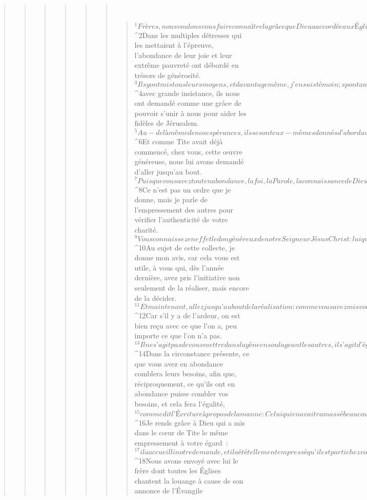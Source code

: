 \begin{verse}
\begin{verse}
\begin{verse}
\begin{verse}
\begin{verse}
\begin{verse}
         
      \bchapter{}
      \begin{verse}
${}^{1}Frères, nous voulons vous faire connaître la grâce que Dieu a accordée aux Églises de Macédoine. 
${}^{2}Dans les multiples détresses qui les mettaient à l’épreuve, l’abondance de leur joie et leur extrême pauvreté ont débordé en trésors de générosité. 
${}^{3}Ils y ont mis tous leurs moyens, et davantage même, j’en suis témoin ; spontanément, 
${}^{4}avec grande insistance, ils nous ont demandé comme une grâce de pouvoir s’unir à nous pour aider les fidèles de Jérusalem. 
${}^{5}Au-delà même de nos espérances, ils se sont eux-mêmes donnés d’abord au Seigneur, et ensuite à nous, par la volonté de Dieu. 
${}^{6}Et comme Tite avait déjà commencé, chez vous, cette œuvre généreuse, nous lui avons demandé d’aller jusqu’au bout. 
${}^{7}Puisque vous avez tout en abondance, la foi, la Parole, la connaissance de Dieu, toute sorte d’empressement et l’amour qui vous vient de nous, qu’il y ait aussi abondance dans votre don généreux ! 
${}^{8}Ce n’est pas un ordre que je donne, mais je parle de l’empressement des autres pour vérifier l’authenticité de votre charité. 
${}^{9}Vous connaissez en effet le don généreux de notre Seigneur Jésus Christ : lui qui est riche, il s’est fait pauvre à cause de vous, pour que vous deveniez riches par sa pauvreté.
${}^{10}Au sujet de cette collecte, je donne mon avis, car cela vous est utile, à vous qui, dès l’année dernière, avez pris l’initiative non seulement de la réaliser, mais encore de la décider. 
${}^{11}Et maintenant, allez jusqu’au bout de la réalisation : comme vous avez mis votre ardeur à prendre cette décision, ainsi vous irez jusqu’au bout, selon vos moyens. 
${}^{12}Car s’il y a de l’ardeur, on est bien reçu avec ce que l’on a, peu importe ce que l’on n’a pas. 
${}^{13}Il ne s’agit pas de vous mettre dans la gêne en soulageant les autres, il s’agit d’égalité. 
${}^{14}Dans la circonstance présente, ce que vous avez en abondance comblera leurs besoins, afin que, réciproquement, ce qu’ils ont en abondance puisse combler vos besoins, et cela fera l’égalité, 
${}^{15}comme dit l’Écriture à propos de la manne : Celui qui en avait ramassé beaucoup n’eut rien de trop, celui qui en avait ramassé peu ne manqua de rien.
${}^{16}Je rends grâce à Dieu qui a mis dans le cœur de Tite le même empressement à votre égard : 
${}^{17}il a accueilli notre demande, et il a été tellement empressé qu’il est parti chez vous spontanément. 
${}^{18}Nous avons envoyé avec lui le frère dont toutes les Églises chantent la louange à cause de son annonce de l’Évangile 

\end{verse}
\end{verse}
\end{verse}
\end{verse}
\end{verse}
\end{verse}
\end{verse}
